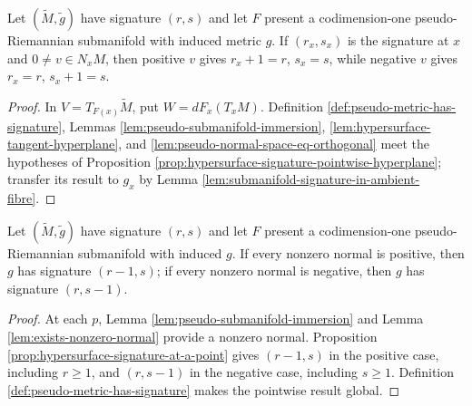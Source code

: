 \begin{proposition}
\label{prop:hypersurface-signature-at-a-point}
\leanok
{}
Let $(\widetilde M,\widetilde g)$ have signature $(r,s)$ and let $F$ present a codimension-one pseudo-Riemannian submanifold with induced metric $g$. If $(r_x,s_x)$ is the signature at $x$ and $0\ne v\in N_xM$, then positive $v$ gives $r_x+1=r$, $s_x=s$, while negative $v$ gives $r_x=r$, $s_x+1=s$.
\end{proposition}
\begin{proof}
\leanok
{}
\sketch In $V=T_{F(x)}\widetilde M$, put $W=dF_x(T_xM)$. Definition \ref{def:pseudo-metric-has-signature}, Lemmas \ref{lem:pseudo-submanifold-immersion}, \ref{lem:hypersurface-tangent-hyperplane}, and \ref{lem:pseudo-normal-space-eq-orthogonal} meet the hypotheses of Proposition \ref{prop:hypersurface-signature-pointwise-hyperplane}; transfer its result to $g_x$ by Lemma \ref{lem:submanifold-signature-in-ambient-fibre}.
\end{proof}

\begin{proposition}
\label{prop:pseudo-riemannian-hypersurface-signature}
\leanok
{}
Let $(\widetilde M,\widetilde g)$ have signature $(r,s)$ and let $F$ present a codimension-one pseudo-Riemannian submanifold with induced $g$. If every nonzero normal is positive, then $g$ has signature $(r-1,s)$; if every nonzero normal is negative, then $g$ has signature $(r,s-1)$.
\end{proposition}
\begin{proof}
\leanok
{}
\sketch At each $p$, Lemma \ref{lem:pseudo-submanifold-immersion} and Lemma \ref{lem:exists-nonzero-normal} provide a nonzero normal. Proposition \ref{prop:hypersurface-signature-at-a-point} gives $(r-1,s)$ in the positive case, including $r\ge1$, and $(r,s-1)$ in the negative case, including $s\ge1$. Definition \ref{def:pseudo-metric-has-signature} makes the pointwise result global.
\end{proof}


